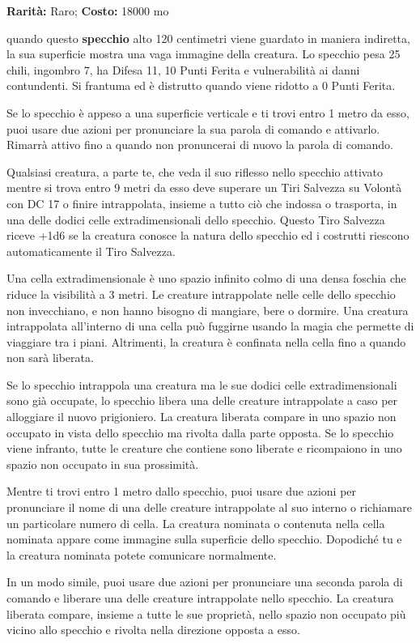 \begin{multicols}{2}
\textbf{Rarità:} Raro; \textbf{Costo:} 18000 mo

quando questo \textbf{specchio} alto 120 centimetri viene guardato in maniera indiretta, la sua superficie mostra una vaga immagine della creatura. Lo specchio pesa 25 chili, ingombro 7, ha Difesa 11, 10 Punti Ferita e vulnerabilità ai danni contundenti. Si frantuma ed è distrutto quando viene ridotto a 0 Punti Ferita.

Se lo specchio è appeso a una superficie verticale e ti trovi entro 1 metro da esso, puoi usare due azioni per pronunciare la sua parola di comando e attivarlo. Rimarrà attivo fino a quando non pronuncerai di nuovo la parola di comando.

Qualsiasi creatura, a parte te, che veda il suo riflesso nello specchio attivato mentre si trova entro 9 metri da esso deve superare un Tiri Salvezza su Volontà con DC 17 o finire intrappolata, insieme a tutto ciò che indossa o trasporta, in una delle dodici celle extradimensionali dello specchio. Questo Tiro Salvezza riceve +1d6 se la creatura conosce la natura dello specchio ed i costrutti riescono automaticamente il Tiro Salvezza.

Una cella extradimensionale è uno spazio infinito colmo di una densa foschia che riduce la visibilità a 3 metri. Le creature intrappolate nelle celle dello specchio non invecchiano, e non hanno bisogno di mangiare, bere o dormire. Una creatura intrappolata all'interno di una cella può fuggirne usando la magia che permette di viaggiare tra i piani. Altrimenti, la creatura è confinata nella cella fino a quando non sarà liberata.

Se lo specchio intrappola una creatura ma le sue dodici celle extradimensionali sono già occupate, lo specchio libera una delle creature intrappolate a caso per alloggiare il nuovo prigioniero. La creatura liberata compare in uno spazio non occupato in vista dello specchio ma rivolta dalla parte opposta. Se lo specchio viene infranto, tutte le creature che contiene sono liberate e ricompaiono in uno spazio non occupato in sua prossimità.

Mentre ti trovi entro 1 metro dallo specchio, puoi usare due azioni per pronunciare il nome di una delle creature intrappolate al suo interno o richiamare un particolare numero di cella. La creatura nominata o contenuta nella cella nominata appare come immagine sulla superficie dello specchio. Dopodiché tu e la creatura nominata potete comunicare normalmente.

In un modo simile, puoi usare due azioni per pronunciare una seconda parola di comando e liberare una delle creature intrappolate nello specchio. La creatura liberata compare, insieme a tutte le sue proprietà, nello spazio non occupato più vicino allo specchio e rivolta nella direzione opposta a esso.


\end{multicols}
